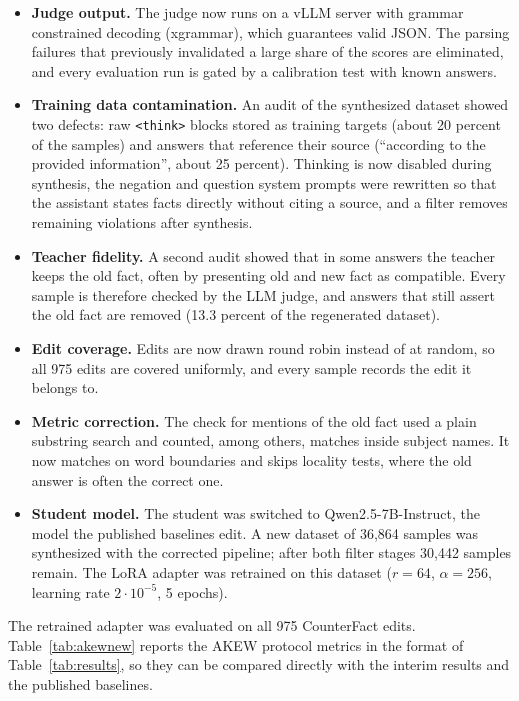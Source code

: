 \documentclass[10pt,a4paper]{article}
\begin{document}
\begin{itemize}\itemsep2pt
  \item \textbf{Judge output.} The judge now runs on a vLLM server with grammar
        constrained decoding (xgrammar), which guarantees valid JSON. The parsing
        failures that previously invalidated a large share of the scores are eliminated,
        and every evaluation run is gated by a calibration test with known answers.
  \item \textbf{Training data contamination.} An audit of the synthesized dataset showed
        two defects: raw \texttt{<think>} blocks stored as training targets (about 20
        percent of the samples) and answers that reference their source (``according to
        the provided information'', about 25 percent). Thinking is now disabled during
        synthesis, the negation and question system prompts were rewritten so that the
        assistant states facts directly without citing a source, and a filter removes
        remaining violations after synthesis.
  \item \textbf{Teacher fidelity.} A second audit showed that in some answers the
        teacher keeps the old fact, often by presenting old and new fact as compatible.
        Every sample is therefore checked by the LLM judge, and answers that still
        assert the old fact are removed (13.3 percent of the regenerated dataset).
  \item \textbf{Edit coverage.} Edits are now drawn round robin instead of at random, so
        all 975 edits are covered uniformly, and every sample records the edit it
        belongs to.
  \item \textbf{Metric correction.} The check for mentions of the old fact used a plain
        substring search and counted, among others, matches inside subject names. It now
        matches on word boundaries and skips locality tests, where the old answer is
        often the correct one.
  \item \textbf{Student model.} The student was switched to Qwen2.5-7B-Instruct, the
        model the published baselines edit. A new dataset of 36{,}864 samples was
        synthesized with the corrected pipeline; after both filter stages 30{,}442
        samples remain. The LoRA adapter was retrained on this dataset
        ($r=64$, $\alpha=256$, learning rate $2\cdot10^{-5}$, 5 epochs).
\end{itemize}

The retrained adapter was evaluated on all 975 CounterFact edits. Table~\ref{tab:akewnew}
reports the AKEW protocol metrics in the format of Table~\ref{tab:results}, so they can
be compared directly with the interim results and the published baselines.
\end{document}
